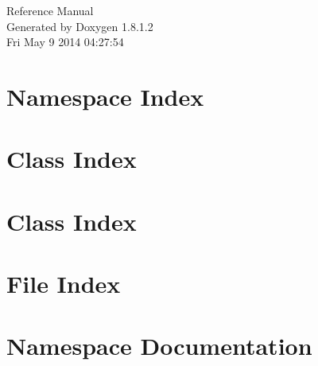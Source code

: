 \documentclass{article}
\begin{document}
\hypersetup{pageanchor=false,citecolor=blue}
\begin{titlepage}
\vspace*{7cm}
\begin{center}
{\Large Reference Manual}\\
\vspace*{1cm}
{\large Generated by Doxygen 1.8.1.2}\\
\vspace*{0.5cm}
{\small Fri May 9 2014 04:27:54}\\
\end{center}
\end{titlepage}
\tableofcontents
{}
\hypersetup{pageanchor=true,citecolor=blue}
\section{Namespace Index}

\section{Class Index}

\section{Class Index}

\section{File Index}

\section{Namespace Documentation}






\end{document}

